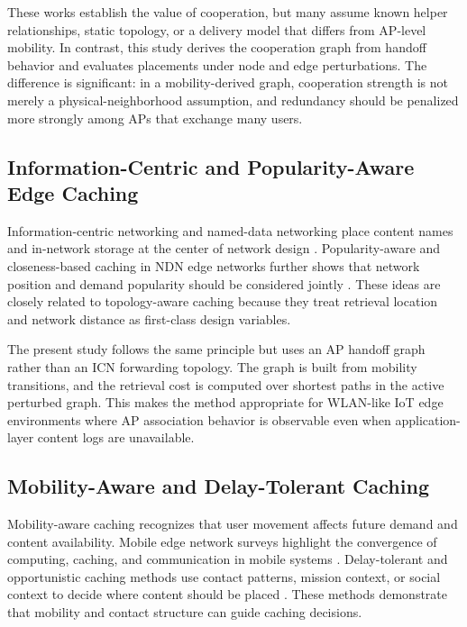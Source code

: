These works establish the value of cooperation, but many assume known helper relationships, static topology, or a delivery model that differs from AP-level mobility. In contrast, this study derives the cooperation graph from handoff behavior and evaluates placements under node and edge perturbations. The difference is significant: in a mobility-derived graph, cooperation strength is not merely a physical-neighborhood assumption, and redundancy should be penalized more strongly among APs that exchange many users.

\subsection{Information-Centric and Popularity-Aware Edge Caching}

Information-centric networking and named-data networking place content names and in-network storage at the center of network design \cite{Zhang2014NDN}. Popularity-aware and closeness-based caching in NDN edge networks further shows that network position and demand popularity should be considered jointly \cite{Amadeo2022}. These ideas are closely related to topology-aware caching because they treat retrieval location and network distance as first-class design variables.

The present study follows the same principle but uses an AP handoff graph rather than an ICN forwarding topology. The graph is built from mobility transitions, and the retrieval cost is computed over shortest paths in the active perturbed graph. This makes the method appropriate for WLAN-like IoT edge environments where AP association behavior is observable even when application-layer content logs are unavailable.

\subsection{Mobility-Aware and Delay-Tolerant Caching}

Mobility-aware caching recognizes that user movement affects future demand and content availability. Mobile edge network surveys highlight the convergence of computing, caching, and communication in mobile systems \cite{Wang2017Mobility}. Delay-tolerant and opportunistic caching methods use contact patterns, mission context, or social context to decide where content should be placed \cite{Mardham2018,Cabaniss2014}. These methods demonstrate that mobility and contact structure can guide caching decisions.

